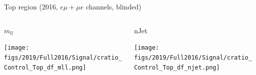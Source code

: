 \documentclass[9pt]{beamer}
\begin{document}
\begin{frame}{Top region (2016, $e \mu + \mu e$ channels, blinded)}
\begin{columns}
	\end{columns} \vspace{-5pt}
	\begin{columns}
		\hspace{5pt}
		\begin{column}{0.32\textwidth}
			\begin{center}
				\begin{block}{\centering $m_{ll}$}\end{block}
     			\texttt{[image: figs/2019/Full2016/Signal/cratio\_Control\_Top\_df\_mll.png]}
    		\end{center}		
		\end{column} \hfill
		\begin{column}{0.32\textwidth}
			\begin{center}
\begin{block}{\centering nJet}\end{block}
     			\texttt{[image: figs/2019/Full2016/Signal/cratio\_Control\_Top\_df\_njet.png]}
    		\end{center}		
		\end{column} \hfill
	\end{columns}
\end{frame}
\end{document}
